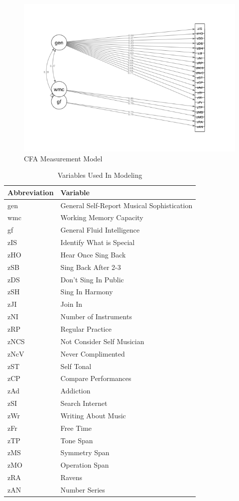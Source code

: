 \documentclass[12pt,]{book}
\begin{document}
\begin{figure}

{\centering \includegraphics[width=1\linewidth]{img/measurementModel} 

}

\caption{CFA Measurement Model}\label{fig:measurementmodel}
\end{figure}

\begin{table}[t]

\caption{\label{tab:exp2variables}Variables Used In Modeling}
\centering
\begin{tabular}{ll}
\toprule
Abbreviation & Variable\\
\midrule
gen & General Self-Report Musical Sophistication\\
wmc & Working Memory Capacity\\
gf & General Fluid Intelligence\\
zIS & Identify What is Special\\
zHO & Hear Once Sing Back\\
\addlinespace
zSB & Sing Back After 2-3\\
zDS & Don’t Sing In Public\\
zSH & Sing In Harmony\\
zJI & Join In\\
zNI & Number of Instruments\\
\addlinespace
zRP & Regular Practice\\
zNCS & Not Consider Self Musician\\
zNcV & Never Complimented\\
zST & Self Tonal\\
zCP & Compare Performances\\
\addlinespace
zAd & Addiction\\
zSI & Search Internet\\
zWr & Writing About Music\\
zFr & Free Time\\
zTP & Tone Span\\
\addlinespace
zMS & Symmetry Span\\
zMO & Operation Span\\
zRA & Ravens\\
zAN & Number Series\\
\bottomrule
\end{tabular}
\end{table}
\end{document}
